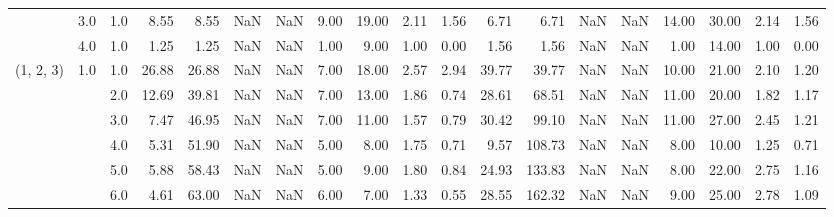 \begin{tabular}{lllrrrrrrrrrrrrrrrr}
          & 3.0 & 1.0  &      8.55 &       8.55 &               NaN &                NaN &  9.00 &  19.00 &             2.11 &                         1.56 &      6.71 &       6.71 &               NaN &                NaN & 14.00 &  30.00 &             2.14 &                         1.56 \\
          & 4.0 & 1.0  &      1.25 &       1.25 &               NaN &                NaN &  1.00 &   9.00 &             1.00 &                         0.00 &      1.56 &       1.56 &               NaN &                NaN &  1.00 &  14.00 &             1.00 &                         0.00 \\
(1, 2, 3) & 1.0 & 1.0  &     26.88 &      26.88 &               NaN &                NaN &  7.00 &  18.00 &             2.57 &                         2.94 &     39.77 &      39.77 &               NaN &                NaN & 10.00 &  21.00 &             2.10 &                         1.20 \\
          &     & 2.0  &     12.69 &      39.81 &               NaN &                NaN &  7.00 &  13.00 &             1.86 &                         0.74 &     28.61 &      68.51 &               NaN &                NaN & 11.00 &  20.00 &             1.82 &                         1.17 \\
          &     & 3.0  &      7.47 &      46.95 &               NaN &                NaN &  7.00 &  11.00 &             1.57 &                         0.79 &     30.42 &      99.10 &               NaN &                NaN & 11.00 &  27.00 &             2.45 &                         1.21 \\
          &     & 4.0  &      5.31 &      51.90 &               NaN &                NaN &  5.00 &   8.00 &             1.75 &                         0.71 &      9.57 &     108.73 &               NaN &                NaN &  8.00 &  10.00 &             1.25 &                         0.71 \\
          &     & 5.0  &      5.88 &      58.43 &               NaN &                NaN &  5.00 &   9.00 &             1.80 &                         0.84 &     24.93 &     133.83 &               NaN &                NaN &  8.00 &  22.00 &             2.75 &                         1.16 \\
          &     & 6.0  &      4.61 &      63.00 &               NaN &                NaN &  6.00 &   7.00 &             1.33 &                         0.55 &     28.55 &     162.32 &               NaN &                NaN &  9.00 &  25.00 &             2.78 &                         1.09 \\

\end{tabular}
